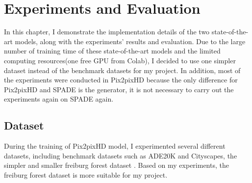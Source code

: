 \chapter{Experiments and Evaluation}
In this chapter, I demonstrate the implementation details of the two state-of-the-art models, 
along with the experiments' results and evaluation. Due to the large number of training time 
of these state-of-the-art models and the limited computing resources(one free GPU from Colab), 
I decided to use one simpler dataset \cite{valada16iser} instead of the benchmark datasets 
for my project. In addition, most of the experiments were conducted in Pix2pixHD because 
the only difference for Pix2pixHD and SPADE is the generator, it is not necessary to carry 
out the experiments again on SPADE again.

\section{Dataset}
During the training of Pix2pixHD model, I experimented several different datasets, including 
benchmark datasets such as ADE20K\cite{zhou2017scene} and Cityscapes\cite{Cordts2016Cityscapes}, 
the simpler and smaller freiburg forest dataset \cite{valada16iser}. Based on my experiments, 
the freiburg forest dataset \cite{valada16iser} is more suitable for my project.
